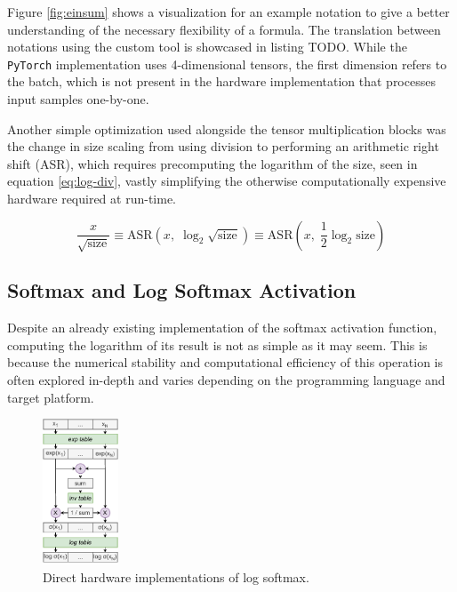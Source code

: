 Figure \ref{fig:einsum} shows a visualization for an example notation to give a better understanding of the necessary flexibility of a formula. The translation between notations using the custom tool is showcased in listing TODO. While the \texttt{PyTorch} implementation uses 4-dimensional tensors, the first dimension refers to the batch, which is not present in the hardware implementation that processes input samples one-by-one.

\todofig{|}
\todofig{|}
\todofig{|}
\todofig{|}
\todofig{|}

Another simple optimization used alongside the tensor multiplication blocks was the change in size scaling from using division to performing an arithmetic right shift (ASR), which requires precomputing the logarithm of the size, seen in equation \ref{eq:log-div}, vastly simplifying the otherwise computationally expensive hardware required at run-time.

\begin{equation}\label{eq:log-div}
  \frac{x}{\sqrt{\text{size}}} \equiv \text{ASR}(x,\; \log_2 \sqrt{\text{size}}) \equiv \text{ASR}(x,\; \frac{1}{2}\log_2 \text{size})
\end{equation}


\subsection{Softmax and Log Softmax Activation}
Despite an already existing \hlsml implementation of the softmax activation function, computing the logarithm of its result is not as simple as it may seem. This is because the numerical stability and computational efficiency of this operation is often explored in-depth \cite{60-blanchard2019accurate} and varies depending on the programming language and target platform.

\begin{figure}[hpt!]
  \centering
  \includegraphics[trim={0cm 0cm 0cm 0cm}, width=0.2\textwidth, center]{models/log_softmax_naive.pdf}
  \caption{Direct hardware implementations of log softmax.}
  \label{fig:log-softmax-naive}
\end{figure}

